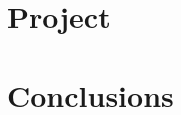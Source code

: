 \documentclass{article}
\theoremstyle{theorem}
\theoremstyle{definition}
\theoremstyle{remark}
\begin{document}
\section{Project}
 

\section{Conclusions}\label{conclusions}

\begin{thebibliography}{99}

\end{thebibliography}
\end{document}

